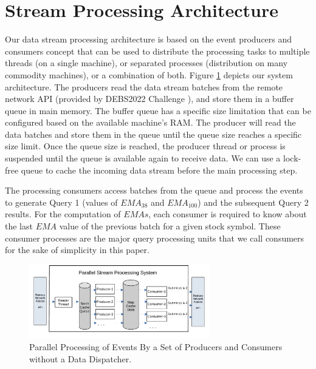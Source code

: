 \section{Stream Processing Architecture}\label{sec:concepts}
Our data stream processing architecture is based on the event producers and consumers concept that can be used to distribute the 
processing tasks to multiple threads (on a single machine), or separated processes 
(distribution on many commodity machines), or a combination of both.
Figure \ref{fig:parallel-srream-processing1} depicts our system architecture. The producers read the data stream batches from the 
remote network API (provided by DEBS2022 Challenge \cite{debs2022challenge}), and store them in a buffer queue in main memory.
The buffer queue has a specific size limitation that can be configured based on the available machine's RAM. The producer will read the data batches 
and store them in the queue until the queue size reaches a specific size limit. Once the queue size is reached, the producer thread or process 
is suspended until the queue is available again to receive data. We can use a lock-free queue to cache the incoming data stream before the main processing step. 

The processing consumers access batches from the queue and process the events to generate Query 1 (values of $EMA_{38}$ and $EMA_{100}$)
and the subsequent Query 2 results. For the computation of $EMAs$, each consumer is required to know about the 
last $EMA$ value of the previous batch for a given stock symbol.
These consumer processes are the major query processing units that we call consumers for the sake of simplicity in this paper.

\begin{figure}[!ht]
    \begin{center}
        \includegraphics[width=0.7\textwidth]{./images/Parallel-Stream-Processing-System_v2}
        \caption{Parallel Processing of Events By a Set of Producers and Consumers without a Data Dispatcher.}
        \label{fig:parallel-srream-processing1}
    \end{center}
\end{figure}

